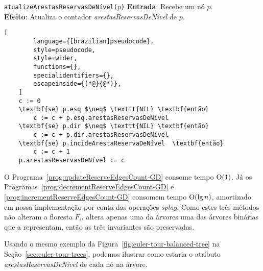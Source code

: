 \begin{programruledcaption}{\texttt{atualizeArestasReservasDeNível($p$)} \label{prog:updateReserveEdgesCount-GD}}
    \noindent\textbf{Entrada}: Recebe um nó $p$.
    \\
    \noindent\textbf{Efeito}: Atualiza o contador \textit{arestasReservasDeNível} de $p$.
    \vspace{-0.5\baselineskip}
    \begin{lstlisting}[
        language={[brazilian]pseudocode},
        style=pseudocode,
        style=wider,
        functions={},
        specialidentifiers={},
        escapeinside={(*@}{@*)},
    ]
    c := 0
    \textbf{se} p.esq $\neq$ \texttt{NIL} \textbf{então}
        c := c + p.esq.arestasReservasDeNível
    \textbf{se} p.dir $\neq$ \texttt{NIL} \textbf{então}
        c := c + p.dir.arestasReservasDeNível
    \textbf{se} p.incideArestaReservaDeNível  \textbf{então}
        c := c + 1
    p.arestasReservasDeNível := c
    \end{lstlisting}
    \vspace{-0.5\baselineskip}
\end{programruledcaption}

O Programa~\ref{prog:updateReserveEdgesCount-GD} consome tempo $\mathrm{O}(1)$. Já os Programas~\ref{prog:decrementReserveEdgesCount-GD} e \ref{prog:incrementReserveEdgesCount-GD} consomem tempo $\mathrm{O}(\lg n)$, amortizado em nossa implementação por conta das operações \textit{splay}. Como estes três métodos não alteram a floresta $F_i$, altera apenas uma da árvores uma das árvores binárias que a representam, então as três invariantes são preservadas. 

Usando o mesmo exemplo da Figura~\ref{fig:euler-tour-balanced-tree} na Seção~\ref{sec:euler-tour-trees}, podemos ilustrar como estaria o atributo \textit{arestasReservasDeNível} de cada nó na árvore.

